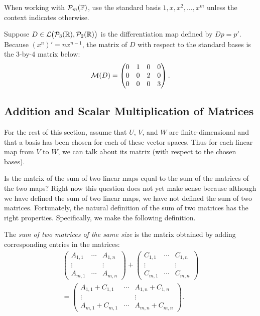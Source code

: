 When working with $\mathcal{P}_m(\mathbb{F})$, use the standard basis
$1,x,x^2,\dots,x^m$ unless the context indicates otherwise.

\begin{example}\label{ax:3.33}
Suppose $D\in\mathcal{L}\bigl(\mathcal{P}_3(\mathbb{R}),\allowbreak\mathcal{P}_2(\mathbb{R})\bigr)$ is the differentiation
map defined by $Dp=p'$. Because $(x^n)'=nx^{n-1}$, the matrix of $D$ with
respect to the standard bases is the $3$-by-$4$ matrix below:
\[ \mathcal{M}(D) = \begin{pmatrix} 0 & 1 & 0 & 0\\ 0 & 0 & 2 & 0\\ 0 & 0 & 0 & 3
   \end{pmatrix}. \]
\end{example}

\subsection{Addition and Scalar Multiplication of Matrices}

For the rest of this section, assume that $U$, $V$, and $W$ are
finite-dimensional and that a basis has been chosen for each of these vector
spaces. Thus for each linear map from $V$ to $W$, we can talk about its matrix
(with respect to the chosen bases).

Is the matrix of the sum of two linear maps equal to the sum of the matrices of
the two maps? Right now this question does not yet make sense because although
we have defined the sum of two linear maps, we have not defined the sum of two
matrices. Fortunately, the natural definition of the sum of two matrices has
the right properties. Specifically, we make the following definition.

\begin{definition}\label{ax:3.34}
The \emph{sum of two matrices of the same size} is the matrix obtained by
adding corresponding entries in the matrices:
\begin{multline*}
\begin{pmatrix} A_{1,1} & \cdots & A_{1,n}\\ \vdots & & \vdots\\
   A_{m,1} & \cdots & A_{m,n} \end{pmatrix}
 + \begin{pmatrix} C_{1,1} & \cdots & C_{1,n}\\ \vdots & & \vdots\\
   C_{m,1} & \cdots & C_{m,n} \end{pmatrix}\\
 = \begin{pmatrix} A_{1,1}+C_{1,1} & \cdots & A_{1,n}+C_{1,n}\\
   \vdots & & \vdots\\
   A_{m,1}+C_{m,1} & \cdots & A_{m,n}+C_{m,n} \end{pmatrix}.
\end{multline*}
\end{definition}

